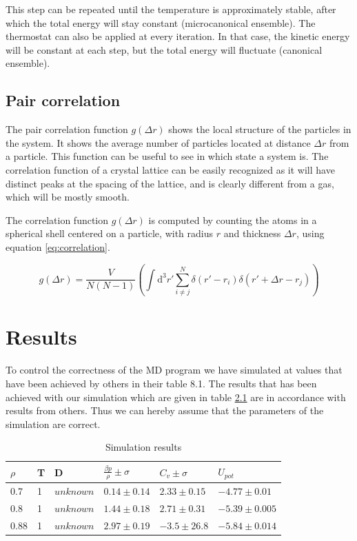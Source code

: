\documentclass[12pt,a4paper]{report}
\begin{document}
This step can be repeated until the temperature is approximately stable, after which the total energy will stay constant (microcanonical ensemble). The thermostat can also be applied at every iteration. In that case, the kinetic energy will be constant at each step, but the total energy will fluctuate (canonical ensemble).

\section{Pair correlation}

The pair correlation function $g(\Delta r)$ shows the local structure of the particles in the system. It shows the average number of particles located at distance $\Delta r$ from a particle. This function can be useful to see in which state a system is. The correlation function of a crystal lattice can be easily recognized as it will have distinct peaks at the spacing of the lattice, and is clearly different from a gas, which will be mostly smooth.

The correlation function $g(\Delta r)$ is computed by counting the atoms in a spherical shell centered on a particle, with radius $r$ and thickness $\Delta r$, using equation \ref{eq:correlation}.

\begin{equation}\label{eq:correlation}
	g(\Delta r) = \frac{V}{N(N-1)} \left( \int \text{d}^3 r' \sum_{i \neq j}^{N} \delta(r'-r_i) \delta(r' + \Delta r - r_j) \right)
\end{equation}

\chapter{Results}

To control the correctness of the MD program we have simulated at values that have been achieved by others \cite{thijssen} in their table 8.1. The results that has been achieved with our simulation which are given in table \ref{table:results} are in accordance with results from others. Thus we can hereby assume that the parameters of the simulation are correct.
\begin{table}[h]
\caption{Simulation results}\label{table:results}
\begin{center}
	\begin{tabular}{| l | l | l | l | l | l |}
	\hline
	$\rho$ & T & D &$ \frac{\beta p}{\rho} \pm \sigma $& $C_v \pm \sigma$ &$ U_{pot}$ \\ \hline
	0.7 & 1 & $ unknown$ & $0.14\pm 0.14$ & $ 2.33 \pm 0.15$ & $-4.77\pm 0.01$   \\
	0.8 & 1 & $ unknown$ & $1.44\pm 0.18$ & $ 2.71 \pm 0.31$ & $-5.39\pm 0.005$   \\
	0.88 & 1 & $ unknown$ & $2.97\pm 0.19$ & $ -3.5 \pm 26.8$ & $-5.84\pm 0.014$   \\
	\hline
	\end{tabular}
\end{center}
\end{table}
\end{document}
